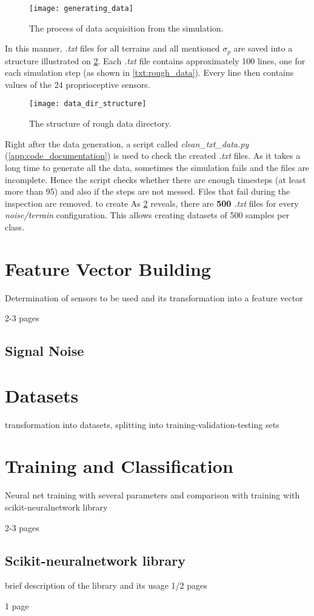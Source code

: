 \begin{figure}[H]
  \centering
  \texttt{[image: generating\_data]}
  \caption{The process of data acquisition from the simulation.}
  \label{img:generating_data}
\end{figure}

In this manner, \textit{.txt} files for all terrains and all mentioned $ \sigma_p $ are saved into a structure illustrated on \cref{img:data_dir_structure}. Each \textit{.txt} file contains approximately 100 lines, one for each simulation step (as shown in \cref{txt:rough_data}). Every line then contains values of the 24 proprioceptive sensors.

\begin{figure}[H]
  \centering
  \texttt{[image: data\_dir\_structure]}
  \caption{The structure of rough data directory.}
  \label{img:data_dir_structure}
\end{figure}

Right after the data generation, a script called \textit{clean\_txt\_data.py} (\ref{app:code_documentation}) is used to check the created \textit{.txt} files. As it takes a long time to generate all the data, sometimes the simulation fails and the files are incomplete. Hence the script checks whether there are enough timesteps (at least more than 95) and also if the steps are not messed. Files that fail during the inspection are removed.
to create
As \cref{img:data_dir_structure} reveals, there are \textbf{500} \textit{.txt} files for every \textit{noise/terrain} configuration. This allows creating datasets of 500 samples per class.

\section{Feature Vector Building} \label{sec:feature_vector_building}
Determination of sensors to be used and its transformation into a feature vector

2-3 pages

\subsection{Signal Noise} \label{ssec:signal_noise}

\section{Datasets}
transformation into datasets, splitting into training-validation-testing sets

\section{Training and Classification}

Neural net training with several parameters and comparison with training with scikit-neuralnetwork library

2-3 pages

\subsection{Scikit-neuralnetwork library}
brief description of the library and its usage 1/2 pages

1 page
